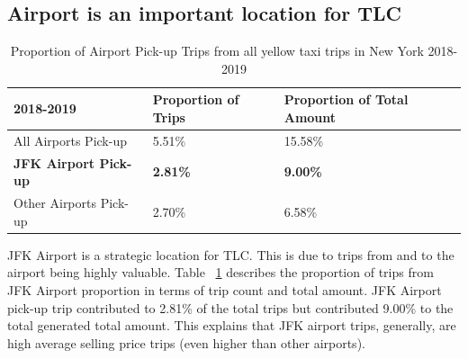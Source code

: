 \documentclass[11pt]{article}
\begin{document}
\subsection{Airport is an important location for TLC}
\begin{table}[h]
	\begin{center}
		\begin{tabular}{|l|l|l|}			
			\hline
			2018-2019 & Proportion of Trips & Proportion of Total Amount \\
			\hline\hline
            All Airports Pick-up & 5.51\% & 15.58\% \\
			\hline
			\textbf{JFK Airport Pick-up} & \textbf{2.81\%} & \textbf{9.00\%}\\
			\hline
			Other Airports Pick-up & 2.70\% & 6.58\% \\
			\hline
		\end{tabular}
		\caption{Proportion of Airport Pick-up Trips from all yellow taxi trips in New York 2018-2019}
		\label{table1}
		
	\end{center}
\end{table}
JFK Airport is a strategic location for TLC. This is due to trips from and to the airport being highly valuable. Table ~\ref{table1} describes the proportion of trips from JFK Airport proportion in terms of trip count and total amount. JFK Airport pick-up trip contributed to 2.81\% of the total trips but contributed 9.00\% to the total generated total amount. This explains that JFK airport trips, generally, are high average selling price trips (even higher than other airports).
\end{document}
